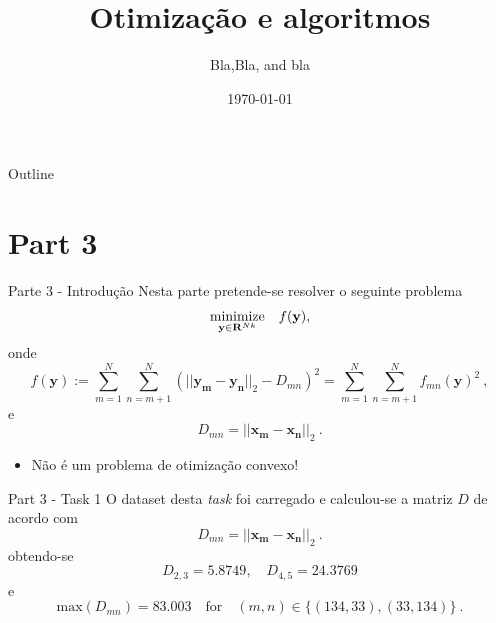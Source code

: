 \documentclass{beamer}					%
\title{Otimização e algoritmos}	%
\author{Bla,Bla, and bla}	%
\institute{IST}					%
\date{\today}									%
\begin{document}
\begin{frame}
  \titlepage
\end{frame}

\begin{frame}{Outline}
  \tableofcontents
\end{frame}

%

\section{Part 3}

\begin{frame}{Parte 3  - Introdução}
Nesta parte pretende-se resolver o seguinte problema
\begin{equation*} \label{eq:problem}
\begin{array}[t]{ll} 
\underset{\mathbf{y} \in \mathbf{R}^{Nk}}{\text{minimize}} & f(\mathbf{y}),\\
\end{array} 
\end{equation*}
onde
\begin{equation*}\label{eq:deff}
f(\mathbf{y}) := \sum_{m=1}^{N}\sum_{n=m+1}^{N}\left(||\mathbf{y_m}-\mathbf{y_n}||_2-D_{mn}\right)^2 = \sum_{m=1}^{N}\sum_{n=m+1}^{N} f_{mn}(\mathbf{y})^2 \:,
\end{equation*} 
e
\begin{equation*}\label{key}
D_{mn} = ||\mathbf{x_m}-\mathbf{x_n}||_2 \:.
\end{equation*}
\begin{itemize}
\item Não é um problema de otimização convexo!
\end{itemize}
\end{frame}

\begin{frame}{Part 3  - Task 1}
	O dataset desta \textit{task} foi carregado e calculou-se a matriz $D$ de acordo com 
	\begin{equation*}\label{key}
D_{mn} = ||\mathbf{x_m}-\mathbf{x_n}||_2 \:.
\end{equation*}
obtendo-se
\begin{equation*}\label{key}
D_{2,3} = 5.8749, \quad D_{4,5} = 24.3769
\end{equation*} 
e
\begin{equation*}\label{key}
\mathrm{max}(D_{mn}) = 83.003 \quad \text{for} \quad (m,n) \in \{(134,33),(33,134)\}\:.
\end{equation*}\end{frame}
\end{document}
